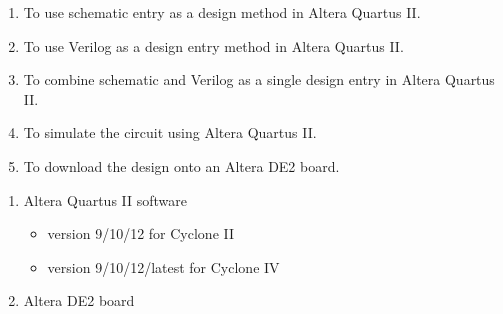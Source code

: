 
\begin{objectives}
  \begin{enumerate}
    \item To use schematic entry as a design method in Altera Quartus II.
    \item To use Verilog as a design entry method in Altera Quartus II.
    \item To combine schematic and Verilog as a single design entry in Altera Quartus II.
    \item To simulate the circuit using Altera Quartus II.
    \item To download the design onto an Altera DE2 board.
  \end{enumerate}
\end{objectives}

\begin{equipment}
  \begin{enumerate}
    \item Altera Quartus II software
          \begin{itemize}
            \item version 9/10/12 for Cyclone II
            \item version 9/10/12/latest for Cyclone IV
          \end{itemize}
    \item Altera DE2 board
  \end{enumerate}
\end{equipment}

